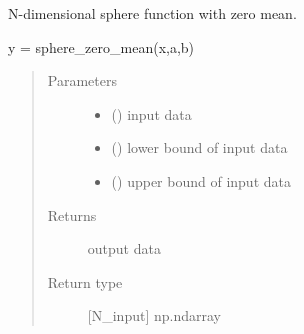 \documentclass[letterpaper,10pt,english,openany,oneside]{sphinxmanual}
\begin{document}

\begin{fulllineitems}
\label{\detokenize{pygpc:pygpc.testfun.sphere_zero_mean}}
N-dimensional sphere function with zero mean.

y = sphere\_zero\_mean(x,a,b)
\begin{quote}\begin{description}
\item[{Parameters}] \leavevmode\begin{itemize}
\item {} 
 (\sphinxstyleliteralemphasis{\sphinxupquote{{[}}}\sphinxstyleliteralemphasis{\sphinxupquote{{]} }}) \textendash{} input data

\item {} 
 (\sphinxstyleliteralemphasis{\sphinxupquote{{[}}}\sphinxstyleliteralemphasis{\sphinxupquote{{]} }}) \textendash{} lower bound of input data

\item {} 
 (\sphinxstyleliteralemphasis{\sphinxupquote{{[}}}\sphinxstyleliteralemphasis{\sphinxupquote{{]} }}) \textendash{} upper bound of input data

\end{itemize}

\item[{Returns}] \leavevmode
{} \textendash{} output data

\item[{Return type}] \leavevmode
{[}N\_input{]} np.ndarray

\end{description}\end{quote}

\end{fulllineitems}

\end{document}
